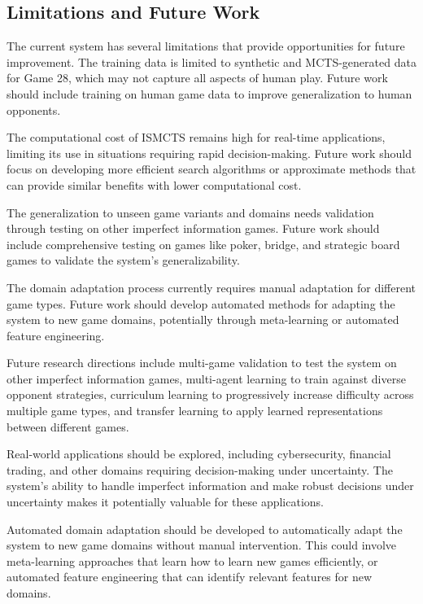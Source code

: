 \documentclass[conference]{IEEEtran}
\begin{document}
\subsection{Limitations and Future Work}

The current system has several limitations that provide opportunities for future improvement. The training data is limited to synthetic and MCTS-generated data for Game 28, which may not capture all aspects of human play. Future work should include training on human game data to improve generalization to human opponents.

The computational cost of ISMCTS remains high for real-time applications, limiting its use in situations requiring rapid decision-making. Future work should focus on developing more efficient search algorithms or approximate methods that can provide similar benefits with lower computational cost.

The generalization to unseen game variants and domains needs validation through testing on other imperfect information games. Future work should include comprehensive testing on games like poker, bridge, and strategic board games to validate the system's generalizability.

The domain adaptation process currently requires manual adaptation for different game types. Future work should develop automated methods for adapting the system to new game domains, potentially through meta-learning or automated feature engineering.

Future research directions include multi-game validation to test the system on other imperfect information games, multi-agent learning to train against diverse opponent strategies, curriculum learning to progressively increase difficulty across multiple game types, and transfer learning to apply learned representations between different games.

Real-world applications should be explored, including cybersecurity, financial trading, and other domains requiring decision-making under uncertainty. The system's ability to handle imperfect information and make robust decisions under uncertainty makes it potentially valuable for these applications.

Automated domain adaptation should be developed to automatically adapt the system to new game domains without manual intervention. This could involve meta-learning approaches that learn how to learn new games efficiently, or automated feature engineering that can identify relevant features for new domains.
\end{document}
